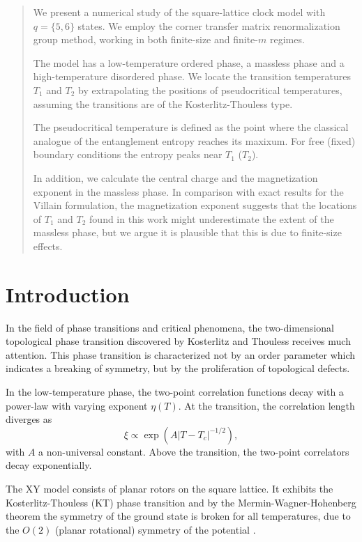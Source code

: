 \begin{abstract}
\noindent We present a numerical study of the square-lattice clock model with $q = \{5, 6\}$ states.
We employ the corner transfer matrix renormalization group method,
working in both finite-size and finite-$m$ regimes.

The model has a low-temperature ordered phase, a massless phase and a high-temperature disordered phase.
We locate the transition temperatures $T_1$ and $T_2$ by extrapolating the positions of pseudocritical temperatures,
assuming the transitions are of the Kosterlitz-Thouless type.

The pseudocritical temperature is defined as the point where the classical analogue of the entanglement entropy reaches
its maxixum. For free (fixed) boundary conditions the entropy peaks near $T_1$ ($T_2$).

In addition, we calculate the central charge and the magnetization exponent in the massless phase.
In comparison with exact results for the Villain formulation, the magnetization exponent suggests that the locations of
$T_1$ and $T_2$ found in this work might underestimate the extent of the massless phase,
but we argue it is plausible that this is due to finite-size effects.
\end{abstract}

\section{Introduction}
In the field of phase transitions and critical phenomena, the two-dimensional topological phase transition discovered by
Kosterlitz and Thouless \cite{kosterlitz1973ordering, kosterlitz1974critical} receives much attention. This phase
transition is characterized not by an order parameter which indicates a breaking of symmetry, but by the proliferation
of topological defects.

In the low-temperature phase, the two-point correlation functions decay with a power-law with varying
exponent $\eta(T)$. At the transition, the correlation length diverges as
\begin{equation}\label{eq:corr_length_divergence_kt}
  \xi \propto \exp(A |T - T_c|^{-1/2}),
\end{equation}
with $A$ a non-universal constant. Above the transition, the two-point correlators decay exponentially.

The XY model consists of planar rotors on the square lattice. It exhibits the Kosterlitz-Thouless (KT) phase transition
and by the Mermin-Wagner-Hohenberg theorem the symmetry of the ground state is broken for all temperatures, due to
the $O(2)$ (planar rotational) symmetry of the potential \cite{mermin1966absence, hohenberg1967existence}.

